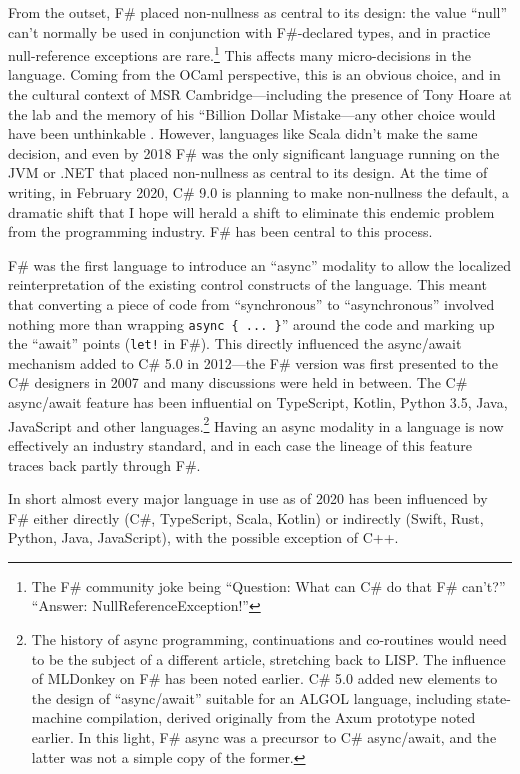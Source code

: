 \documentclass[acmsmall]{acmart}\settopmatter{}
\begin{document}
From the outset, F\# placed non-nullness as central to its design: the value “null” can’t normally be used in conjunction
with F\#-declared types, and in practice null-reference exceptions are rare.\footnote{The F\# community joke being “Question: What can C\# do that F\# can’t?” “Answer: NullReferenceException!”}   This affects many micro-decisions in the
language. Coming from the OCaml perspective, this is an obvious choice, and in the cultural context of MSR
Cambridge---including the presence of Tony Hoare at the lab and the memory of his “Billion Dollar Mistake---any
other choice would have been unthinkable \citep{HoareNulls2011}.  However, languages like Scala didn’t make the same
decision, and even by 2018 F\# was the only significant language running on the JVM or .NET that placed non-nullness
as central to its design. At the time of writing, in February 2020, C\# 9.0 is planning to make non-nullness the
default, a dramatic shift that I hope will herald a shift to eliminate this endemic problem from the programming industry. F\# has been central to this process.

F\# was the first language to introduce an “async” modality to allow the localized reinterpretation of the existing
control constructs of the language. This meant that converting a piece of code from “synchronous” to
“asynchronous” involved nothing more than wrapping \texttt{async \{ ... \}}” around the code and marking up
the “await” points (\texttt{let!} in F\#).   This directly influenced the async/await mechanism added to C\# 5.0 in 2012---the
F\# version was first presented to the C\# designers in 2007 and many discussions were held in
between.  The C\# async/await feature has been influential on TypeScript, Kotlin, Python 3.5, Java, JavaScript and other
languages.\footnote{The history of async programming, continuations and co-routines would need to be the subject
of a different article, stretching back to LISP. The influence of MLDonkey
on F\# has been noted earlier. C\# 5.0 added new elements to the design
of “async/await” suitable for an ALGOL language, including state-machine compilation,
derived originally from the Axum prototype noted earlier.  In this light, F\# async was a
precursor to C\# async/await, and the latter was not a simple copy of the former.}
Having an async modality in a language is now effectively an industry standard, and in each case the lineage of this
feature traces back partly through F\#.

In short almost every major language in use as of 2020 has been influenced by F\# either directly (C\#, TypeScript, Scala, Kotlin) or
indirectly (Swift, Rust, Python, Java, JavaScript), with the possible exception of C++.
\end{document}
